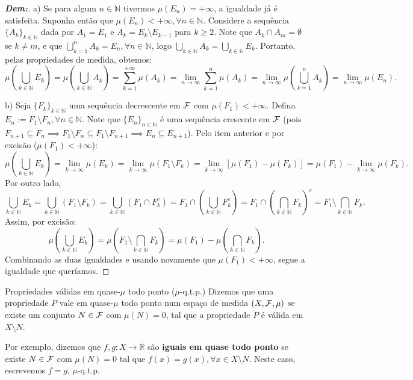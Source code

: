 \begin{proof}[\textbf{Dem:}]
a) Se para algum $n \in \mathbb{N}$ tivermos $\mu(E_n) = +\infty$, a igualdade já é satisfeita. Suponha então que $\mu(E_n) < +\infty, \forall n \in \mathbb{N}$. Considere a sequência $\{A_k\}_{k \in \mathbb{N}}$ dada por $A_1 = E_1$ e $A_k = E_k \setminus E_{k-1}$ para $k \ge 2$. Note que $A_k \cap A_m = \emptyset$ se $k \neq m$, e que $\bigcup_{k=1}^n A_k = E_n, \forall n \in \mathbb{N}$, logo $\bigcup_{k \in \mathbb{N}} A_k = \bigcup_{k \in \mathbb{N}} E_k$. Portanto, pelas propriedades de medida, obtemos:
$$ \mu\left(\bigcup_{k \in \mathbb{N}} E_k\right) = \mu\left(\bigcup_{k \in \mathbb{N}} A_k\right) = \sum_{k=1}^{+\infty} \mu(A_k) = \lim_{n \to \infty} \sum_{k=1}^n \mu(A_k) = \lim_{n \to \infty} \mu\left(\bigcup_{k=1}^n A_k\right) = \lim_{n \to \infty} \mu(E_n). $$

b) Seja $\{F_k\}_{k \in \mathbb{N}}$ uma sequência decrescente em $\mathcal{F}$ com $\mu(F_1) < +\infty$. Defina $E_n := F_1 \setminus F_n, \forall n \in \mathbb{N}$. Note que $\{E_n\}_{n \in \mathbb{N}}$ é uma sequência crescente em $\mathcal{F}$ (pois $F_{n+1} \subseteq F_n \implies F_1 \setminus F_n \subseteq F_1 \setminus F_{n+1} \implies E_n \subseteq E_{n+1}$).
Pelo item anterior e por excisão ($\mu(F_1) < +\infty$):
$$ \mu\left(\bigcup_{k \in \mathbb{N}} E_k\right) = \lim_{k \to \infty} \mu(E_k) = \lim_{k \to \infty} \mu(F_1 \setminus F_k) = \lim_{k \to \infty} [\mu(F_1) - \mu(F_k)] = \mu(F_1) - \lim_{k \to \infty} \mu(F_k). $$
Por outro lado, 
$$ \bigcup_{k \in \mathbb{N}} E_k = \bigcup_{k \in \mathbb{N}} (F_1 \setminus F_k) = \bigcup_{k \in \mathbb{N}} (F_1 \cap F_k^c) = F_1 \cap \left(\bigcup_{k \in \mathbb{N}} F_k^c\right) = F_1 \cap \left(\bigcap_{k \in \mathbb{N}} F_k\right)^c = F_1 \setminus \bigcap_{k \in \mathbb{N}} F_k. $$
Assim, por excisão:
$$ \mu\left(\bigcup_{k \in \mathbb{N}} E_k\right) = \mu\left(F_1 \setminus \bigcap_{k \in \mathbb{N}} F_k\right) = \mu(F_1) - \mu\left(\bigcap_{k \in \mathbb{N}} F_k\right). $$
Combinando as duas igualdades e usando novamente que $\mu(F_1) < +\infty$, segue a  
igualdade que queríamos.
\end{proof}

\begin{definition*}{Propriedades válidas em quase-$\mu$ todo ponto ($\mu$-q.t.p.)}
Dizemos que uma propriedade $P$ vale em quase-$\mu$ todo ponto num espaço de medida $(X, \mathcal{F}, \mu)$ se existe um conjunto $N \in \mathcal{F}$ com $\mu(N) = 0$, tal que a propriedade $P$ é válida em $X \setminus N$.
\end{definition*}
\vspace{5mm}
Por exemplo, dizemos que $f, g: X \to \overline{\mathbb{R}}$ são \textbf{iguais em quase todo ponto} se existe $N \in \mathcal{F}$ com $\mu(N) = 0$ tal que $f(x) = g(x), \forall x \in X \setminus N$. Neste caso, escrevemos $f = g$, $\mu$-q.t.p.


